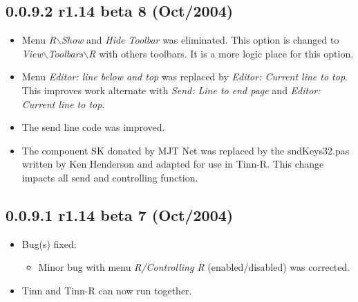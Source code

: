 \subsection*{0.0.9.2 r1.14 beta 8 (Oct/2004)}
\begin{itemize}
  \item Menu \textit{R$\backslash$Show} and \textit{Hide \RR{} Toolbar} was eliminated. This option is changed
    to \textit{View$\backslash$Toolbars$\backslash$R} with others toolbars. It is a more logic place for this option.
  \item Menu \textit{Editor: line below and top} was replaced by \textit{Editor: Current line to top}.
    This improves work alternate with \textit{Send: Line to end page} and \textit{Editor: Current line to top}.
  \item The send line code was improved.
  \item The component SK donated by MJT Net was replaced by the sndKeys32.pas written by Ken Henderson
    and adapted for use in Tinn-R. This change impacts all send and controlling \RR{} function.
\end{itemize}


\subsection*{0.0.9.1 r1.14 beta 7 (Oct/2004)}
\begin{itemize}
  \item Bug(s) fixed:
    \begin{itemize}
      \item Minor bug with menu \textit{R/Controlling R} (enabled/disabled) was corrected.
    \end{itemize}
  \item Tinn and Tinn-R can now run together.
\end{itemize}


